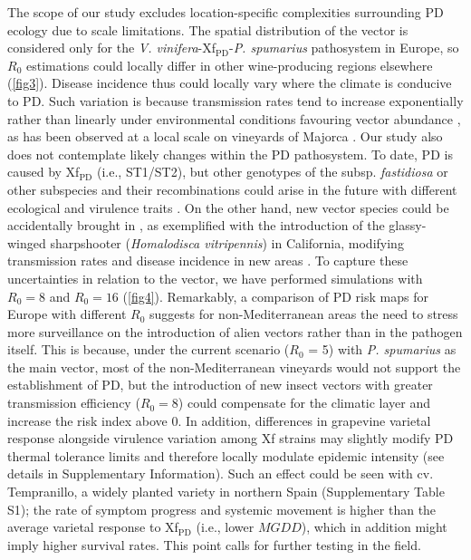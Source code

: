     The scope of our study excludes location-specific complexities surrounding
    PD
    ecology due to scale limitations. The spatial distribution of the vector is
    considered only for the \textit{V. vinifera}-Xf$_{\textrm{PD}}$-{\textit{P.
        spumarius}} pathosystem in Europe, so $R_0$ estimations could locally
    differ in
    other wine-producing regions elsewhere (\cref{fig3}). Disease incidence
    thus
    could locally vary where the climate is conducive to PD. Such variation is
    because transmission rates tend to increase exponentially rather than
    linearly
    under environmental conditions favouring vector abundance
    \cite{Gruber2012}, as
    has been observed at a local scale on vineyards of Majorca
    \cite{Moralejo2019}.
    Our study also does not contemplate likely changes within the PD
    pathosystem.
    To date, PD is caused by Xf$_{\textrm{PD}}$ (i.e., ST1/ST2), but other
    genotypes of the subsp. \textit{fastidiosa} or other subspecies and their
    recombinations could arise in the future with different ecological and
    virulence traits \cite{Vanhove2019}. On the other hand, new vector species
    could be accidentally brought in \cite{Redak2004}, as exemplified with the
    introduction of the glassy-winged sharpshooter (\textit{Homalodisca
        vitripennis}) in California, modifying transmission rates and disease
    incidence
    in new areas \cite{Daugherty2019}. To capture these uncertainties in
    relation
    to the vector, we have performed simulations with $R_0 = 8$ and $R_0 = 16$
    (\cref{fig4}). Remarkably, a comparison of PD risk maps for Europe with
    different $R_0$ suggests for non-Mediterranean areas the need to stress
    more
    surveillance on the introduction of alien vectors rather than in the
    pathogen
    itself. This is because, under the current scenario ($R_0$ = 5) with
    \textit{P.
        spumarius} as the main vector, most of the non-Mediterranean vineyards
    would
    not support the establishment of PD, but the introduction of new insect
    vectors
    with greater transmission efficiency ($R_0=8$) could compensate for the
    climatic layer and increase the risk index above 0. In addition,
    differences in
    grapevine varietal response alongside virulence variation among Xf strains
    may
    slightly modify PD thermal tolerance limits and therefore locally modulate
    epidemic intensity (see details in Supplementary Information). Such an
    effect
    could be seen with cv. Tempranillo, a widely planted variety in northern
    Spain
    (Supplementary Table S1); the rate of symptom progress and systemic
    movement is
    higher than the average varietal response to Xf$_{\textrm{PD}}$ (i.e.,
    lower
$MGDD$), which in addition might imply higher survival rates. This point calls
    for further testing in the field.

